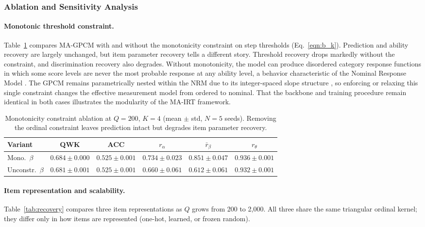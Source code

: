 \documentclass[pdflatex,sn-apa]{sn-jnl}
\begin{document}
\subsubsection{Ablation and Sensitivity Analysis}

\paragraph{Monotonic threshold constraint.}
Table~\ref{tab:ablation_monotonic} compares MA-GPCM with and without the monotonicity constraint on step thresholds (Eq.~\ref{eqn:b_k}). Prediction and ability recovery are largely unchanged, but item parameter recovery tells a different story. Threshold recovery drops markedly without the constraint, and discrimination recovery also degrades. Without monotonicity, the model can produce disordered category response functions in which some score levels are never the most probable response at any ability level, a behavior characteristic of the Nominal Response Model \citep{bock_estimating_1972}. The GPCM remains parametrically nested within the NRM due to its integer-spaced slope structure \citep{de_ayala_theory_2009}, so enforcing or relaxing this single constraint changes the effective measurement model from ordered to nominal. That the backbone and training procedure remain identical in both cases illustrates the modularity of the MA-IRT framework.

\begin{table}[htb!]
\centering
\caption{Monotonicity constraint ablation at $Q=200$, $K=4$ (mean $\pm$ std, $N\!=\!5$ seeds). Removing the ordinal constraint leaves prediction intact but degrades item parameter recovery.}
\label{tab:ablation_monotonic}
\setlength{\tabcolsep}{2pt}
\begin{tabular}{lccccc}
\toprule
\textbf{Variant} & \textbf{QWK} & \textbf{ACC} & $r_\alpha$ & $\bar{r}_\beta$ & $r_\theta$ \\
\midrule
Mono.\ $\beta$ & $\mathbf{0.684} \pm 0.000$ & $0.525 \pm 0.001$ & $\mathbf{0.734} \pm 0.023$ & $\mathbf{0.851} \pm 0.047$ & $\mathbf{0.936} \pm 0.001$ \\
Unconstr.\ $\beta$ & $0.681 \pm 0.001$ & $0.525 \pm 0.001$ & $0.660 \pm 0.061$ & $0.612 \pm 0.061$ & $0.932 \pm 0.001$ \\
\bottomrule
\end{tabular}
\end{table}

\paragraph{Item representation and scalability.}
Table~\ref{tab:recovery} compares three item representations as $Q$ grows from 200 to 2{,}000. All three share the same triangular ordinal kernel; they differ only in how items are represented (one-hot, learned, or frozen random).
\end{document}
